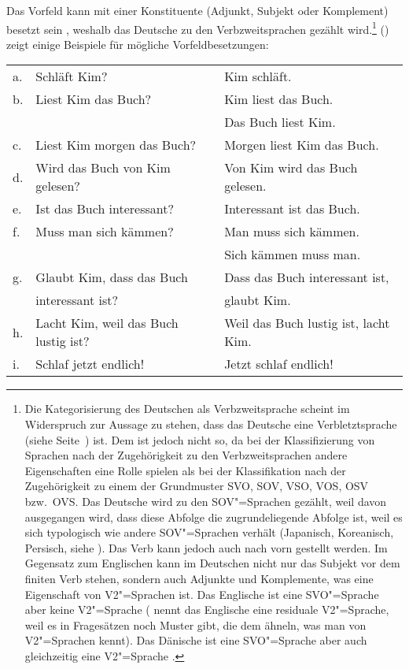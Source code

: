 Das Vorfeld kann mit einer Konstituente (Adjunkt, Subjekt oder Komplement) besetzt sein \parencites[Kapitel~2.4]{Erdmann1886a}[, ]{Paul1919a}, weshalb das Deutsche zu den Verbzweitsprachen gezählt wird.\footnote{%
  Die Kategorisierung des Deutschen als Verbzweitsprache scheint im Widerspruch zur Aussage zu stehen, 
  dass das Deutsche eine Verbletztsprache (siehe Seite~\pageref{page-verbletzt}) ist. Dem ist
  jedoch nicht so, da bei der Klassifizierung von Sprachen nach der Zugehörigkeit zu den Verbzweitsprachen
  andere Eigenschaften eine Rolle spielen als bei der Klassifikation nach der Zugehörigkeit zu einem
  der Grundmuster SVO, SOV, VSO, VOS, OSV bzw.\ OVS. Das Deutsche wird zu den SOV"=Sprachen gezählt,
  weil davon ausgegangen wird, dass diese Abfolge die zugrundeliegende Abfolge ist, weil es sich
  typologisch wie andere SOV"=Sprachen verhält (Japanisch, Koreanisch, Persisch, siehe
  \citealt{Haider2020a}). Das Verb kann jedoch auch nach vorn gestellt werden. Im Gegensatz zum
  Englischen kann im Deutschen nicht nur das Subjekt vor dem finiten Verb stehen, sondern auch
  Adjunkte und Komplemente, was eine Eigenschaft von V2"=Sprachen ist. Das Englische ist eine
  SVO"=Sprache aber keine V2"=Sprache (\citet[]{Rizzi1990a-u} nennt das Englische eine
  residuale V2"=Sprache, weil es in Fragesätzen noch Muster gibt, die dem ähneln, was man von
  V2"=Sprachen kennt). Das Dänische ist eine SVO"=Sprache aber auch gleichzeitig eine V2"=Sprache
  \citep{Vikner95a-u,MOeDanish,MuellerGermanic}.%
}
() zeigt einige Beispiele für mögliche Vorfeldbesetzungen:
\ea
\label{fragen}
\begin{tabular}[t]{@{}l@{~}ll}
a. & Schläft Kim?                                       & Kim schläft.\\
b. & Liest Kim das Buch?                            & Kim liest das Buch.\\
   &                                                      & Das Buch liest Kim.\\
c. & Liest Kim morgen das Buch?                      & Morgen liest Kim das Buch.\\
d. & Wird das Buch von Kim gelesen?                    & Von Kim wird das Buch gelesen.\\
e. & Ist das Buch interessant?                           & Interessant ist das Buch.\\
f. & Muss man sich kämmen?                                & Man muss sich kämmen.\\
   &                                                      & Sich kämmen muss man.\\
g. & Glaubt Kim, dass das Buch         & Dass das Buch interessant ist, \\
   & interessant ist?                                            & glaubt Kim.\\
h. & Lacht Kim, weil das Buch lustig ist?              & Weil das Buch lustig ist, lacht Kim.\\
i. & Schlaf jetzt endlich!                                & Jetzt schlaf endlich!\\
\end{tabular}
\z


